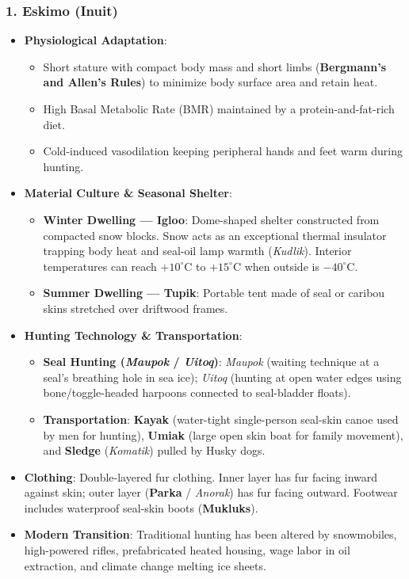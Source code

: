\documentclass[11pt,a4paper]{article}
\begin{document}
\subsubsection{1. Eskimo (Inuit)}
\begin{itemize}[leftmargin=*]
  \item \textbf{Physiological Adaptation}:
  \begin{itemize}
    \item Short stature with compact body mass and short limbs (\textbf{Bergmann's and Allen's Rules}) to minimize body surface area and retain heat.
    \item High Basal Metabolic Rate (BMR) maintained by a protein-and-fat-rich diet.
    \item Cold-induced vasodilation keeping peripheral hands and feet warm during hunting.
  \end{itemize}

  \item \textbf{Material Culture \& Seasonal Shelter}:
  \begin{itemize}
    \item \textbf{Winter Dwelling --- Igloo}: Dome-shaped shelter constructed from compacted snow blocks. Snow acts as an exceptional thermal insulator trapping body heat and seal-oil lamp warmth (\textit{Kudlik}). Interior temperatures can reach $+10^\circ\text{C}$ to $+15^\circ\text{C}$ when outside is $-40^\circ\text{C}$.
    \item \textbf{Summer Dwelling --- Tupik}: Portable tent made of seal or caribou skins stretched over driftwood frames.
  \end{itemize}

  \item \textbf{Hunting Technology \& Transportation}:
  \begin{itemize}
    \item \textbf{Seal Hunting (\textit{Maupok} / \textit{Uitoq})}: \textit{Maupok} (waiting technique at a seal's breathing hole in sea ice); \textit{Uitoq} (hunting at open water edges using bone/toggle-headed harpoons connected to seal-bladder floats).
    \item \textbf{Transportation}: \textbf{Kayak} (water-tight single-person seal-skin canoe used by men for hunting), \textbf{Umiak} (large open skin boat for family movement), and \textbf{Sledge} (\textit{Komatik}) pulled by Husky dogs.
  \end{itemize}

  \item \textbf{Clothing}: Double-layered fur clothing. Inner layer has fur facing inward against skin; outer layer (\textbf{Parka} / \textit{Anorak}) has fur facing outward. Footwear includes waterproof seal-skin boots (\textbf{Mukluks}).

  \item \textbf{Modern Transition}: Traditional hunting has been altered by snowmobiles, high-powered rifles, prefabricated heated housing, wage labor in oil extraction, and climate change melting ice sheets.
\end{itemize}
\end{document}
